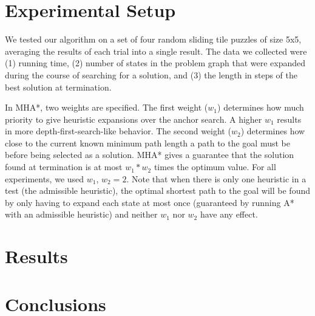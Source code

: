 \documentclass{article}
\begin{document}
\section{Experimental Setup}

We tested our algorithm on a set of four random sliding tile puzzles of size 5x5, averaging the results of each trial into a single result. The data we collected were (1) running time, (2) number of states in the problem graph that were expanded during the course of searching for a solution, and (3) the length in steps of the best solution at termination.




In MHA*, two weights are specified. The first weight ($w_1$) determines how much priority to give heuristic expansions over the anchor search. A higher $w_1$ results in more depth-first-search-like behavior. The second weight ($w_2$) determines how close to the current known minimum path length a path to the goal must be before being selected as a solution. MHA* gives a guarantee that the solution found at termination is at most $w_1 * w_2$ times the optimum value. For all experiments, we used $w_1$, $w_2 = 2$. Note that when there is only one heuristic in a test (the admissible heuristic), the optimal shortest path to the goal will be found by only having to expand each state at most once (guaranteed by running A* with an admissible heuristic) and neither $w_1$ nor $w_2$ have any effect.

\section{Results}



\section{Conclusions}

\end{document}
